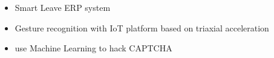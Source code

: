 \documentclass{res}
\begin{document}
\begin{resume}
\begin{itemize}[leftmargin=*]
					\item Smart Leave ERP system
					\vspace{-0.07in}
					
					\item Gesture recognition with IoT platform based on triaxial acceleration
					\vspace{-0.07in}
					\item use Machine Learning to hack CAPTCHA					
			\end{itemize}

				          
			 
		\end{resume}
	
\end{document}
